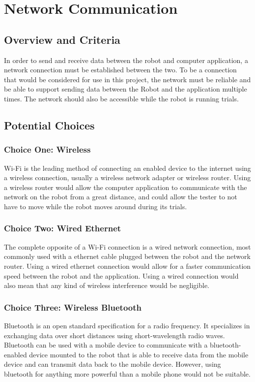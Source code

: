 \documentclass[onecolumn, draftclsnofoot,10pt, compsoc]{report}
\begin{document}
\section{Network Communication}
\subsection{Overview and Criteria}
In order to send and receive data between the robot and computer application, a network connection must be established between the two. To be a connection that would be considered for use in this project, the network must be reliable and be able to support sending data between the Robot and the application multiple times. The network should also be accessible while the robot is running trials.

\subsection{Potential Choices}
\subsubsection{Choice One: Wireless}
Wi-Fi is the leading method of connecting an enabled device to the internet using a wireless connection, usually a wireless network adapter or wireless router. Using a wireless router would allow the computer application to communicate with the network on the robot from a great distance, and could allow the tester to not have to move while the robot moves around during its trials.

\subsubsection{Choice Two: Wired Ethernet}
The complete opposite of a Wi-Fi connection is a wired network connection, most commonly used with a ethernet cable plugged between the robot and the network router. Using a wired ethernet connection would allow for a faster communication speed between the robot and the application. Using a wired connection would also mean that any kind of wireless interference would be negligible.

\subsubsection{Choice Three: Wireless Bluetooth}
Bluetooth is an open standard specification for a radio frequency. It specializes in exchanging data over short distances using short-wavelength radio waves. Bluetooth can be used with a mobile device to communicate with a bluetooth-enabled device mounted to the robot that is able to receive data from the mobile device and can transmit data back to the mobile device. However, using bluetooth for anything more powerful than a mobile phone would not be suitable.\cite{Bluetooth_Robot}
\end{document}
